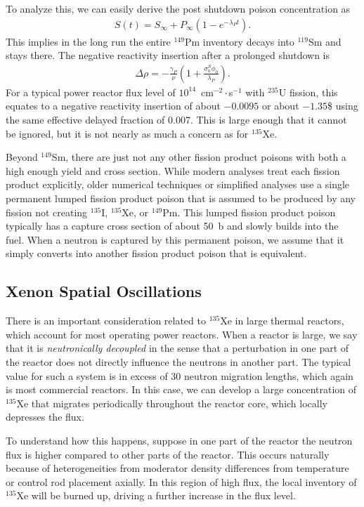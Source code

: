 To analyze this, we can easily derive the post shutdown poison concentration as
\begin{align}
  S(t) = S_\infty + P_\infty ( 1 - e^{-\lambda_P t} ) .
\end{align}
This implies in the long run the entire $^{149}$Pm inventory decays into $^{119}$Sm and stays there. The negative reactivity insertion after a prolonged shutdown is
\begin{align}
  \Delta \rho = -\frac{\gamma_P}{\nu} \left( 1 + \frac{\sigma_a^S \phi_0 }{\lambda_P} \right) .
\end{align}
For a typical power reactor flux level of $10^{14}$~cm$^{-2}\cdot$s$^{-1}$ with $^{235}$U fission, this equates to a negative reactivity insertion of about $-0.0095$ or about $-1.35$\$ using the same effective delayed fraction of 0.007. This is large enough that it cannot be ignored, but it is not nearly as much a concern as for $^{135}$Xe.

Beyond $^{149}$Sm, there are just not any other fission product poisons with both a high enough yield and cross section. While modern analyses treat each fission product explicitly, older numerical techniques or simplified analyses use a single permanent lumped fission product poison that is assumed to be produced by any fission not creating $^{135}$I, $^{135}$Xe, or $^{149}$Pm. This lumped fission product poison typically has a capture cross section of about 50~b and slowly builds into the fuel. When a neutron is captured by this permanent poison, we assume that it simply converts into another fission product poison that is equivalent.

\subsection{Xenon Spatial Oscillations}

There is an important consideration related to $^{135}$Xe in large thermal reactors, which account for most operating power reactors. When a reactor is large, we say that it is \emph{neutronically decoupled} in the sense that a perturbation in one part of the reactor does not directly influence the neutrons in another part. The typical value for such a system is in excess of 30 neutron migration lengths, which again is most commercial reactors. In this case, we can develop a large concentration of $^{135}$Xe that migrates periodically throughout the reactor core, which locally depresses the flux.

To understand how this happens, suppose in one part of the reactor the neutron flux is higher compared to other parts of the reactor. This occurs naturally because of heterogeneities from moderator density differences from temperature or control rod placement axially. In this region of high flux, the local inventory of $^{135}$Xe will be burned up, driving a further increase in the flux level.

